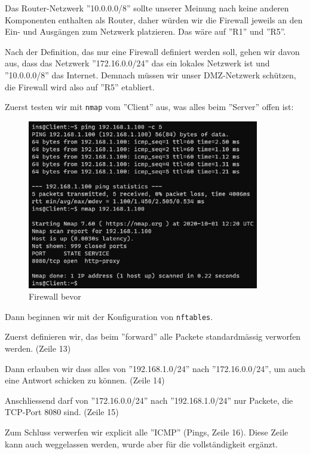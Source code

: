 \documentclass[11pt,titlepage]{article}
\begin{document}
Das Router-Netzwerk ''10.0.0.0/8'' sollte unserer Meinung nach keine anderen Komponenten enthalten als Router, daher würden wir die Firewall jeweils an den Ein- und Ausgängen zum Netzwerk platzieren. Das wäre auf ''R1'' und ''R5''.
\par\medskip
Nach der Definition, das nur eine Firewall definiert werden soll, gehen wir davon aus, dass das Netzwerk ''172.16.0.0/24'' das ein lokales Netzwerk ist und ''10.0.0.0/8'' das Internet. Demnach müssen wir unser DMZ-Netzwerk schützen, die Firewall wird also auf ''R5'' etabliert.
\par\medskip

Zuerst testen wir mit \lstinline!nmap! vom ''Client'' aus, was alles beim ''Server'' offen ist:
\begin{figure}[H]
  \begin{center}
    \includegraphics[width=0.90\textwidth]{images/firewall-before.png}
    \caption{Firewall bevor}
    \label{fig:FirewallBefore}
  \end{center}
\end{figure}

Dann beginnen wir mit der Konfiguration von \lstinline!nftables!.

Zuerst definieren wir, das beim ''forward'' alle Packete standardmässig verworfen werden. (Zeile 13)

Dann erlauben wir dass alles von ''192.168.1.0/24'' nach ''172.16.0.0/24'', um auch eine Antwort schicken zu können. (Zeile 14)

Anschliessend darf von ''172.16.0.0/24'' nach ''192.168.1.0/24'' nur Packete, die TCP-Port 8080 sind. (Zeile 15)

Zum Schluss verwerfen wir explicit alle ''ICMP'' (Pings, Zeile 16). Diese Zeile kann auch weggelassen werden, wurde aber für die vollständigkeit ergänzt.
\end{document}
